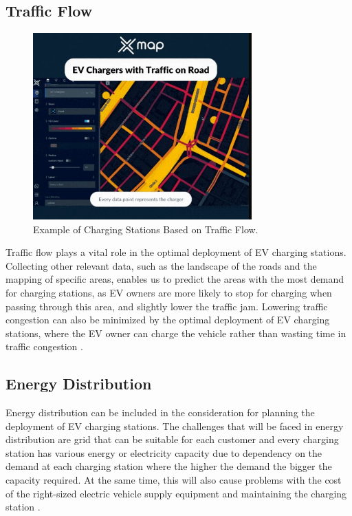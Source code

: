 \subsection{Traffic Flow}\label{sec:42}

\begin{figure}[H]
\begin{center}
\includegraphics[width=0.75\textwidth]{Bilder/[12].jpg}
\caption{Example of Charging Stations Based on Traffic Flow. \cite{TrafficFlowData}}\label{fig:[12]}
\end{center}
\end{figure}

Traffic flow plays a vital role in the optimal deployment of EV charging stations. Collecting other relevant data, such as the landscape of the roads and the mapping of specific areas, enables us to predict the areas with the most demand for charging stations, as EV owners are more likely to stop for charging when passing through this area, and slightly lower the traffic jam. Lowering traffic congestion can also be minimized by the optimal deployment of EV charging stations, where the EV owner can charge the vehicle rather than wasting time in traffic congestion  \cite{TrafficFlowData}.

\subsection{Energy Distribution}\label{sec:43}
Energy distribution can be included in the consideration for planning the deployment of EV charging stations. The challenges that will be faced in energy distribution are grid that can be suitable for each customer and every charging station has various energy or electricity capacity due to dependency on the demand at each charging station where the higher the demand the bigger the capacity required. At the same time, this will also cause problems with the cost of the right-sized electric vehicle supply equipment and maintaining the charging station  \cite{GridPlanning_EV}.


